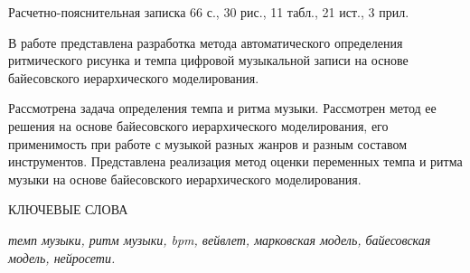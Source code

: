 
Расчетно-пояснительная записка 66 с., 30 рис., 11 табл., 21 ист., 3 прил.

В работе представлена разработка метода автоматического определения ритмического рисунка и темпа цифровой музыкальной записи на основе байесовского иерархического моделирования.

Рассмотрена задача определения темпа и ритма музыки. Рассмотрен метод ее решения на основе байесовского иерархического моделирования, его применимость при работе с музыкой разных жанров и разным составом инструментов. Представлена реализация метод оценки переменных темпа и ритма музыки на основе байесовского иерархического моделирования.

КЛЮЧЕВЫЕ СЛОВА

\textit{темп музыки, ритм музыки, bpm, вейвлет, марковская модель, байесовская модель, нейросети.}

\clearpage
